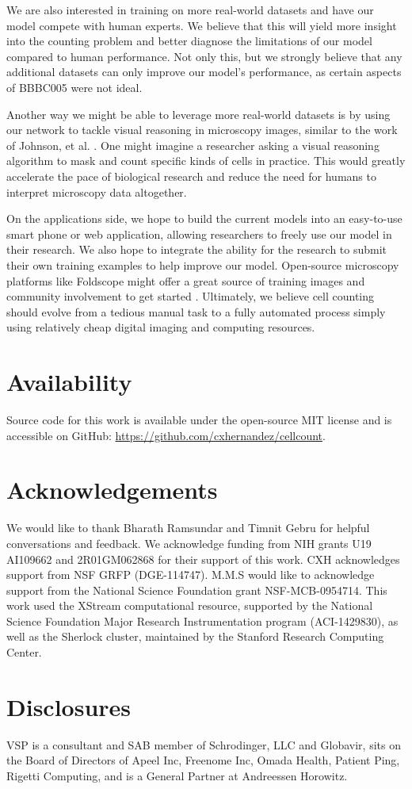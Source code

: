\documentclass[10pt,twocolumn,letterpaper]{article}
\begin{document}
We are also interested in training on more real-world datasets and have our model compete with human experts.
We believe that this will yield more insight into the counting problem and better diagnose the limitations of our model compared to human performance.
Not only this, but we strongly believe that any additional datasets can only improve our model's performance, as certain aspects of BBBC005 were not ideal.

Another way we might be able to leverage more real-world datasets is by using our network to tackle visual reasoning in microscopy images,
similar to the work of Johnson, et al. \cite{visreas}. One might imagine a researcher asking a visual reasoning algorithm to mask and count
specific kinds of cells in practice. This would greatly accelerate the pace of biological research and reduce the need for humans to interpret
microscopy data altogether.

On the applications side, we hope to build the current models into an easy-to-use smart phone or web application, allowing researchers to freely use our model in their research.
We also hope to integrate the ability for the research to submit their own training examples to help improve our model.
Open-source microscopy platforms like Foldscope might offer a great source of training images and community involvement to get started \cite{foldscope}.
Ultimately, we believe cell counting should evolve from a tedious manual task to a fully automated process simply using relatively cheap digital imaging and computing resources. 

\section*{Availability}
Source code for this work is available under the open-source
MIT license and is accessible on GitHub: \href{https://github.com/cxhernandez/cellcount}{https://github.com/cxhernandez/cellcount}.

\section*{Acknowledgements}
We would like to thank Bharath Ramsundar and Timnit Gebru for helpful conversations and feedback.
We acknowledge funding from NIH grants U19 AI109662 and 2R01GM062868 for their support of this work.
CXH acknowledges support from NSF GRFP (DGE-114747). 
M.M.S would like to acknowledge support from the National Science Foundation grant NSF-MCB-0954714.
This work used the XStream computational resource, supported by the National Science Foundation Major Research Instrumentation program (ACI-1429830), as well as the Sherlock cluster, maintained by the Stanford Research Computing Center.

\section*{Disclosures}
VSP is a consultant and SAB member of Schrodinger, LLC and Globavir, sits on the
Board of Directors of Apeel Inc, Freenome Inc, Omada Health, Patient Ping,
Rigetti Computing, and is a General Partner at Andreessen Horowitz.


{\small


}
\end{document}
